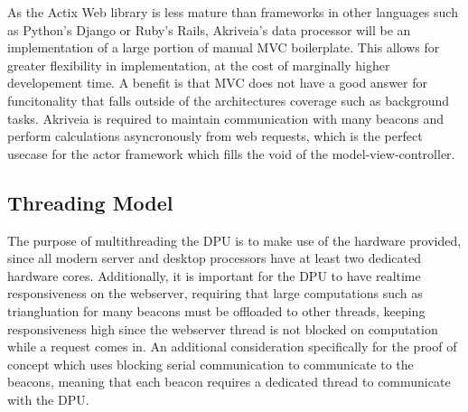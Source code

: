 \bigskip
As the Actix Web library is less mature than frameworks in other languages such as Python's Django or Ruby's Rails, Akriveia's data processor will be an implementation of a large portion of manual MVC boilerplate.
This allows for greater flexibility in implementation, at the cost of marginally higher developement time.
A benefit is that MVC does not have a good answer for funcitonality that falls outside of the architectures coverage such as background tasks.
Akriveia is required to maintain communication with many beacons and perform calculations asyncronously from web requests, which is the perfect usecase for the actor framework which fills the void of the model-view-controller.


\bigskip
\subsection{Threading Model}
The purpose of multithreading the DPU is to make use of the hardware provided, since all modern server and desktop processors have at least two dedicated hardware cores.
Additionally, it is important for the DPU to have realtime responsiveness on the webserver, requiring that large computations such as triangluation for many beacons must be offloaded to other threads, keeping responsiveness high since the webserver thread is not blocked on computation while a request comes in.
An additional consideration specifically for the proof of concept which uses blocking serial communication to communicate to the beacons, meaning that each beacon requires a dedicated thread to communicate with the DPU.

